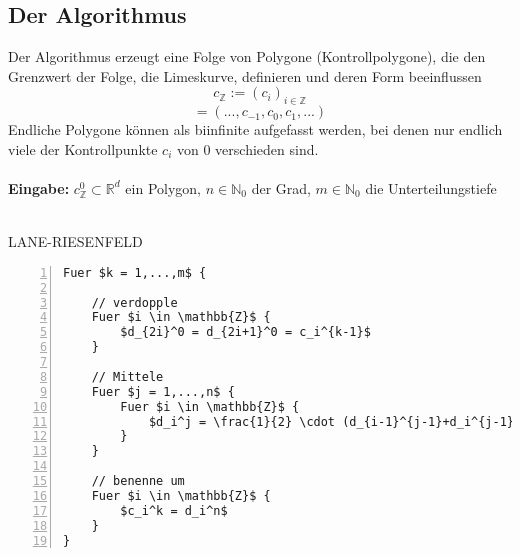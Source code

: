 \subsection{Der Algorithmus}
Der Algorithmus erzeugt eine Folge von Polygone (Kontrollpolygone), die den Grenzwert der Folge, die Limeskurve, definieren und deren Form beeinflussen
\[c_{\mathbb{Z}} := (c_i)_{i \in \mathbb{Z}}\]
\[= (...,c_{-1},c_0,c_1,...)\]
Endliche Polygone können als biinfinite aufgefasst werden, bei denen nur endlich viele der Kontrollpunkte \(c_i\) von \(0\) verschieden sind.
\\\\
\textbf{Eingabe:} \(c_{\mathbb{Z}}^0 \subset \mathbb{R}^d\) ein Polygon, \(n \in \mathbb{N}_0\) der Grad, \(m \in \mathbb{N}_0\) die Unterteilungstiefe
\\\\
\begin{minipage}{\textwidth}
LANE-RIESENFELD
\begin{lstlisting}[frame=single,numbers=left,mathescape]
Fuer $k = 1,...,m$ {

	// verdopple
	Fuer $i \in \mathbb{Z}$ {
		$d_{2i}^0 = d_{2i+1}^0 = c_i^{k-1}$
	}

	// Mittele
	Fuer $j = 1,...,n$ {
		Fuer $i \in \mathbb{Z}$ {
			$d_i^j = \frac{1}{2} \cdot (d_{i-1}^{j-1}+d_i^{j-1})$ 
		}
	}

	// benenne um
	Fuer $i \in \mathbb{Z}$ {
		$c_i^k = d_i^n$
	}
}
\end{lstlisting}
\end{minipage}


